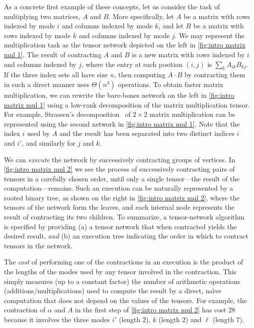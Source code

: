 As a concrete first example of these concepts, let us consider the task of
multiplying two matrices, $A$ and $B$. More specifically, let
$A$ be a matrix with rows indexed by mode $i$ and
columns indexed by mode $k$, and let $B$ be a matrix
with rows indexed by mode $k$ and columns indexed by mode $j$.
We may represent the multiplication task as
the tensor network depicted on the left in \eqref{fig:intro matrix mul 1}.
The result of contracting $A$ and $B$ is a new
matrix with rows indexed by $i$ and columns indexed by $j$, where the
entry at each position $(i,j)$ is $\sum_k A_{ik} B_{kj}$.  If the three
index sets all have size $n$, then computing $A \cdot B$ by contracting
them in such a direct manner uses $\Theta(n^3)$ operations.  To obtain
faster matrix multiplication, we can rewrite the bare-bones network
on the left in \eqref{fig:intro matrix mul 1} using a low-rank
decomposition of the matrix multiplication tensor.
For example, Strassen's decomposition~\cite{Strassen1969}
of $2 \times 2$ matrix multiplication
can be represented using the second network in \eqref{fig:intro matrix mul 1}.
Note that the index $i$ used by $A$ and the result has been separated into
two distinct indices $i$ and $i'$, and similarly for $j$ and $k$.

We can \emph{execute} the network by successively contracting
groups of vertices.  In \eqref{fig:intro matrix mul 2} we see the
process of successively contracting pairs of tensors in a carefully
chosen order, until only a single tensor---the result of the
computation---remains.  Such an execution can be naturally
represented by a rooted binary tree, as shown on the right in
\eqref{fig:intro matrix mul 2}, where the tensors of the network form
the leaves, and each internal node represents the result of
contracting its two children.  To summarize, a tensor-network
algorithm is specified by providing (a) a tensor network that when
contracted yields the desired result, \emph{and} (b) an execution tree
indicating the order in which to contract tensors in the network.


The \emph{cost} of performing one of the contractions in an execution
is the product of the lengths of the modes used by any tensor involved
in the contraction.  This simply measures (up to a constant factor)
the number of arithmetic operations (additions/multiplications) used
to compute the result by a direct, na\"\i{}ve computation that does not
depend on the values of the tensors.  For example, the contraction of
$\alpha$ and $A$ in the first step of \eqref{fig:intro matrix mul 2}
has cost $28$ because it involves the three modes $i'$ (length $2$),
$k$ (length $2$) and $\ell$ (length $7$).

